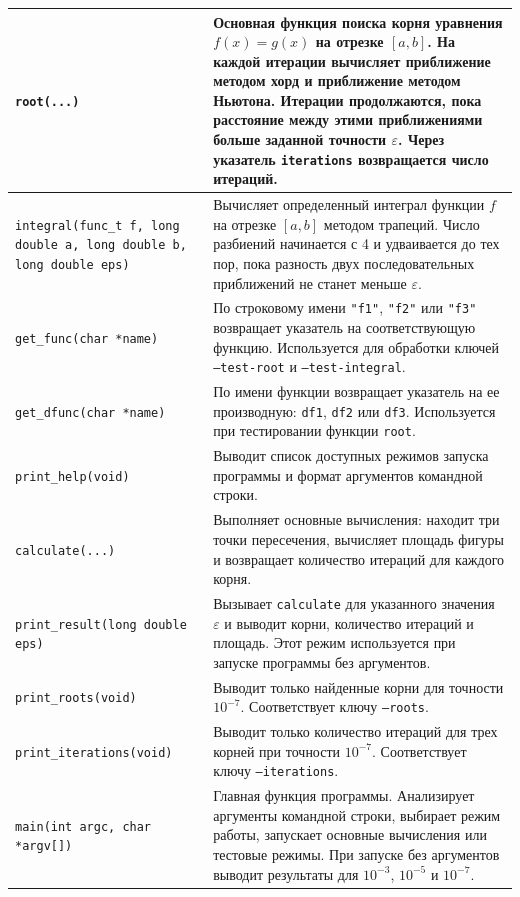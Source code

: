 \documentclass[a4paper,12pt,titlepage,finall]{article}
\begin{document}
\begin{longtable}{|p{}|p{}|}
\hline
\texttt{root(...)} & Основная функция поиска корня уравнения \(f(x)=g(x)\) на отрезке \([a,b]\). На каждой итерации вычисляет приближение методом хорд и приближение методом Ньютона. Итерации продолжаются, пока расстояние между этими приближениями больше заданной точности \(\varepsilon\). Через указатель \texttt{iterations} возвращается число итераций. \\
\hline
\texttt{integral(func\_t f, long double a, long double b, long double eps)} & Вычисляет определенный интеграл функции \(f\) на отрезке \([a,b]\) методом трапеций. Число разбиений начинается с 4 и удваивается до тех пор, пока разность двух последовательных приближений не станет меньше \(\varepsilon\). \\
\hline
\texttt{get\_func(char *name)} & По строковому имени \texttt{"f1"}, \texttt{"f2"} или \texttt{"f3"} возвращает указатель на соответствующую функцию. Используется для обработки ключей \texttt{--test-root} и \texttt{--test-integral}. \\
\hline
\texttt{get\_dfunc(char *name)} & По имени функции возвращает указатель на ее производную: \texttt{df1}, \texttt{df2} или \texttt{df3}. Используется при тестировании функции \texttt{root}. \\
\hline
\texttt{print\_help(void)} & Выводит список доступных режимов запуска программы и формат аргументов командной строки. \\
\hline
\texttt{calculate(...)} & Выполняет основные вычисления: находит три точки пересечения, вычисляет площадь фигуры и возвращает количество итераций для каждого корня. \\
\hline
\texttt{print\_result(long double eps)} & Вызывает \texttt{calculate} для указанного значения \(\varepsilon\) и выводит корни, количество итераций и площадь. Этот режим используется при запуске программы без аргументов. \\
\hline
\texttt{print\_roots(void)} & Выводит только найденные корни для точности \(10^{-7}\). Соответствует ключу \texttt{--roots}. \\
\hline
\texttt{print\_iterations(void)} & Выводит только количество итераций для трех корней при точности \(10^{-7}\). Соответствует ключу \texttt{--iterations}. \\
\hline
\texttt{main(int argc, char *argv[])} & Главная функция программы. Анализирует аргументы командной строки, выбирает режим работы, запускает основные вычисления или тестовые режимы. При запуске без аргументов выводит результаты для \(10^{-3}\), \(10^{-5}\) и \(10^{-7}\). \\
\hline
\end{longtable}
\end{document}
